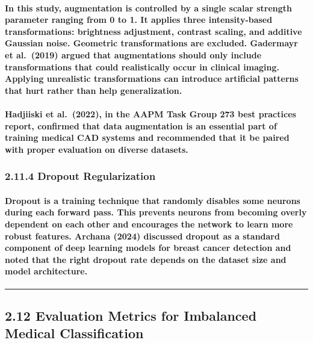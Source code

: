 \paragraph{In this study, augmentation is controlled by a single scalar strength parameter ranging from 0 to 1. It applies three intensity-based transformations: brightness adjustment, contrast scaling, and additive Gaussian noise. Geometric transformations are excluded. Gadermayr et al. (2019) argued that augmentations should only include transformations that could realistically occur in clinical imaging. Applying unrealistic transformations can introduce artificial patterns that hurt rather than help generalization.}

\paragraph{Hadjiiski et al. (2022), in the AAPM Task Group 273 best practices report, confirmed that data augmentation is an essential part of training medical CAD systems and recommended that it be paired with proper evaluation on diverse datasets.}

\subsubsection{2.11.4 Dropout
Regularization}\label{dropout-regularization}

\paragraph{Dropout is a training technique that randomly disables some neurons during each forward pass. This prevents neurons from becoming overly dependent on each other and encourages the network to learn more robust features. Archana (2024) discussed dropout as a standard component of deep learning models for breast cancer detection and noted that the right dropout rate depends on the dataset size and model architecture.}

\begin{center}\rule{0.5\linewidth}{0.5pt}\end{center}

\subsection{2.12 Evaluation Metrics for Imbalanced Medical
Classification}\label{evaluation-metrics-for-imbalanced-medical-classification}

